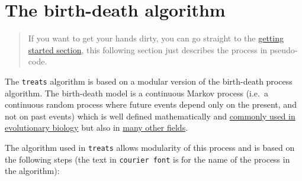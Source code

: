 \documentclass[
]{book}
\begin{document}
\hypertarget{bdalgorithm}{%
\section{The birth-death algorithm}\label{bdalgorithm}}

\begin{quote}
If you want to get your hands dirty, you can go straight to the \protect\hyperlink{gettingstarted}{getting started section}, this following section just describes the process in pseudo-code.
\end{quote}

The \texttt{treats} algorithm is based on a modular version of the birth-death process algorithm.
The birth-death model is a continuous Markov process (i.e.~a continuous random process where future events depend only on the present, and not on past events) which is well defined mathematically and \href{https://lukejharmon.github.io/pcm/chapter10_birthdeath/\#section-10.2-the-birth-death-model}{commonly used in evolutionary biology} but also in \href{https://en.wikipedia.org/wiki/Birth\%E2\%80\%93death_process}{many other fields}.

The algorithm used in \texttt{treats} allows modularity of this process and is based on the following steps (the text in \texttt{courier\ font} is for the name of the process in the algorithm):
\end{document}
